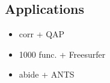 \subsection{Applications}

\begin{itemize}
\item corr + QAP
\item 1000 func. + Freesurfer
\item abide + ANTS
\end{itemize}
